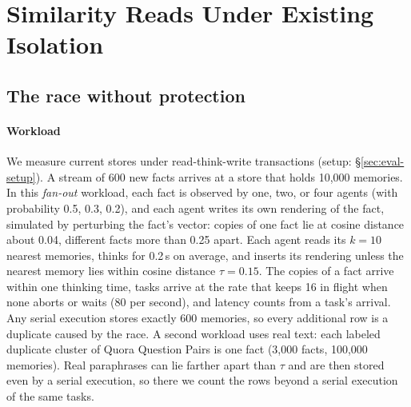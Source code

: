 \documentclass[sigconf, nonacm, review]{acmart}
\begin{document}
\section{Similarity Reads Under Existing Isolation}
\label{sec:anomalies}

\subsection{The race without protection}
\label{sec:race}

\paragraph{Workload}
We measure current stores under read-think-write transactions
(setup: \S\ref{sec:eval-setup}). A stream of 600 new facts arrives at a store that holds 10{,}000
memories. In this \emph{fan-out} workload, each fact is observed by one, two, or four agents (with
probability 0.5, 0.3, 0.2), and each agent writes its own rendering of
the fact, simulated by perturbing the fact's vector: copies of one fact
lie at cosine distance about 0.04, different facts more than 0.25
apart. Each agent reads its $k=10$ nearest memories, thinks for 0.2\,s
on average, and inserts its rendering unless the nearest memory lies
within cosine distance $\tau=0.15$. The copies of a fact arrive within
one thinking time, tasks arrive at the rate that keeps 16 in flight
when none aborts or waits (80 per second), and latency counts from a
task's arrival.
Any serial execution stores exactly 600 memories, so every additional
row is a duplicate caused by the race. A second workload uses real
text: each labeled duplicate cluster of Quora
Question Pairs \cite{DBLP:conf/iclr/WangSMHLB19} is one fact (3{,}000
facts, 100{,}000 memories). Real paraphrases can lie farther apart than
$\tau$ and are then stored even by a serial execution, so there we count
the rows beyond a serial execution of the same tasks.
\end{document}
